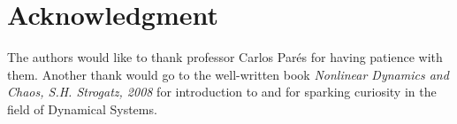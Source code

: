 \documentclass[journal]{IEEEtran}
\begin{document}

%


%


\section*{Acknowledgment}
The authors would like to thank professor Carlos Par\'{e}s for having patience with them. Another thank would go to the well-written book \emph{Nonlinear Dynamics and Chaos, S.H. Strogatz, 2008} for introduction to and for sparking curiosity in the field of Dynamical Systems.

  \newpage

\printbibliography



\end{document}
